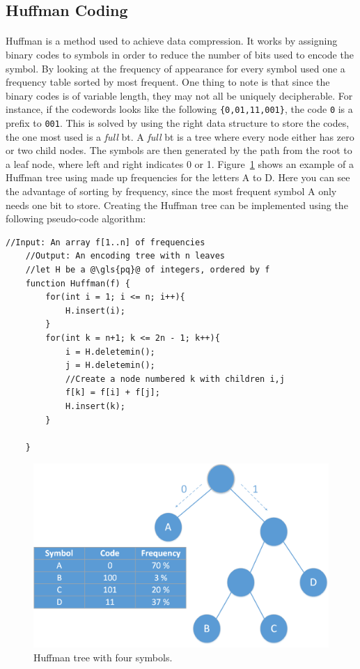 \documentclass[a4paper]{report}
\newcommand{\codeword}[1]{\texttt{#1}}
\begin{document}
\subsection{Huffman Coding} %
\paragraph{}
Huffman is a method used to achieve data compression.\cite{huffman}
It works by assigning binary codes to symbols in order to reduce the number of bits used to encode the symbol.
By looking at the frequency of appearance for every symbol used one a frequency table sorted by most frequent.
One thing to note is that since the binary codes is of variable length, they may not all be uniquely decipherable.
For instance, if the codewords looks like the following \codeword{\{0,01,11,001\}}, the code \codeword{0} is a prefix to \codeword{001}.
This is solved by using the right data structure to store the codes, the one most used is a \textit{full} \gls{bt}.
A \textit{full} \gls{bt} is a tree where every node either has zero or two child nodes.
The symbols are then generated by the path from the root to a leaf node, where left and right indicates 0 or 1.
Figure~\ref{fig:hm-ex} shows an example of a Huffman tree using made up frequencies for the letters A to D.
Here you can see the advantage of sorting by frequency, since the most frequent symbol A only needs one bit to store.
Creating the Huffman tree can be implemented using the following pseudo-code algorithm:

\begin{lstlisting}[caption=Huffman algorithm (From: \cite{algorithms}), label=lst:huffman]
	//Input: An array f[1..n] of frequencies
	//Output: An encoding tree with n leaves
	//let H be a @\gls{pq}@ of integers, ordered by f
	function Huffman(f) {
		for(int i = 1; i <= n; i++){
			H.insert(i);
		}
		for(int k = n+1; k <= 2n - 1; k++){
			i = H.deletemin();
			j = H.deletemin();
			//Create a node numbered k with children i,j
			f[k] = f[i] + f[j];
			H.insert(k);
		}

	}
\end{lstlisting}

\begin{figure}[h!]
	\centering
		\includegraphics[width=1.0\textwidth]{images/huffman.png}
		\caption{Huffman tree with four symbols.}
		\label{fig:hm-ex}
\end{figure}
\end{document}

